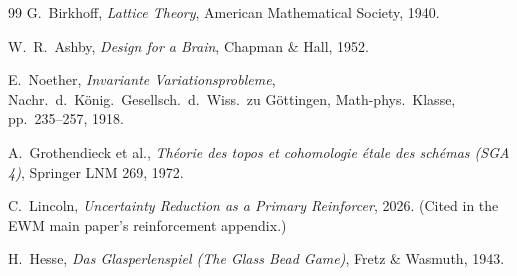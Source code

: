 \documentclass[11pt,a4paper]{article}
\theoremstyle{remark}
\begin{document}
\begin{thebibliography}{99}
 G.~Birkhoff,
\textit{Lattice Theory}, American Mathematical Society, 1940.

 W.~R.~Ashby,
\textit{Design for a Brain}, Chapman \& Hall, 1952.

 E.~Noether,
\textit{Invariante Variationsprobleme}, Nachr.\ d.\ K\"onig.\ Gesellsch.\ d.\
Wiss.\ zu G\"ottingen, Math-phys.\ Klasse, pp.~235--257, 1918.

 A.~Grothendieck et al.,
\textit{Th\'eorie des topos et cohomologie \'etale des sch\'emas (SGA 4)},
Springer LNM 269, 1972.

 C.~Lincoln,
\textit{Uncertainty Reduction as a Primary Reinforcer}, 2026. (Cited in the
EWM main paper's reinforcement appendix.)

 H.~Hesse,
\textit{Das Glasperlenspiel (The Glass Bead Game)}, Fretz \& Wasmuth, 1943.

\end{thebibliography}
\end{document}
